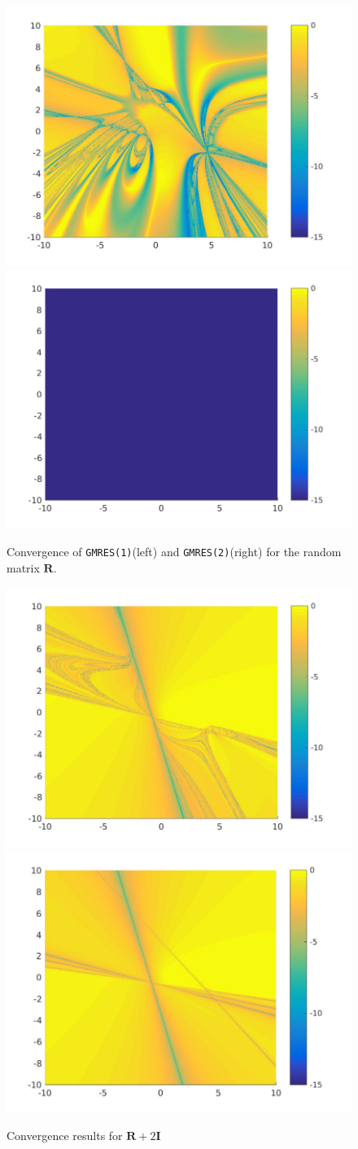 \begin{figure}
\centering
\includegraphics[width=0.45\linewidth]{../src/figure/randAGMRES1}
\includegraphics[width=0.45\linewidth]{../src/figure/randAGMRES2}
\caption{Convergence of \texttt{GMRES(1)}(left) and \texttt{GMRES(2)}(right) for the random matrix $\mathbf{R}$.}
\label{fig:randAGMRES2}
\end{figure}
\begin{figure}
\centering
\includegraphics[width=0.45\linewidth]{../src/figure/randAp2eyeGMRES1}
\includegraphics[width=0.45\linewidth]{../src/figure/randAp2eyeGMRES2}
\caption{Convergence results for $\mathbf{R} + 2\mathbf{I}$}
\label{fig:randAp2eyeGMRES2}
\end{figure}
